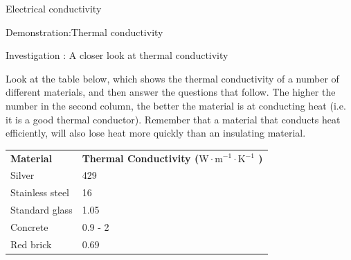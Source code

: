 \begin{iexperiment}{Electrical conductivity}
\begin{gexperiment}{Demonstration:Thermal conductivity}
	\par
\label{m38706*secfhsst!!!underscore!!!id492}
            \begin{gexperiment}{Investigation : A closer look at thermal conductivity}
{            \nopagebreak
      \label{m38706*id66744}Look at the table below, which shows the thermal conductivity of a number of different materials, and then answer the questions that follow. The higher the number in the second column, the better the material is at conducting heat (i.e. it is a good thermal conductor). Remember that a material that conducts heat efficiently, will also lose heat more quickly than an insulating material.\par 
          \begin{table}[H]
        \begin{center}
      \label{m38706*id66753}
    \noindent
      \tablelasttail{}
      \begin{xtabular}[t]{|l|l|}\hline
                \textbf{Material}
               &
                \textbf{Thermal Conductivity ($\mathrm{W}\ensuremath{\cdot}\mathrm{m}{}^{-1}\ensuremath{\cdot}\mathrm{K}{}^{-1}$
) }
     \tabularnewline{}
        Silver &
        429%
     \tabularnewline{}
        Stainless steel &
        16%
     \tabularnewline{}
        Standard glass &
        1.05%
     \tabularnewline{}
        Concrete &
        0.9 - 2%
     \tabularnewline{}
        Red brick &
        0.69%
     \tabularnewline{}

\end{xtabular}
\end{center}
\end{table}}
\end{gexperiment}
\end{gexperiment}
\end{iexperiment}
